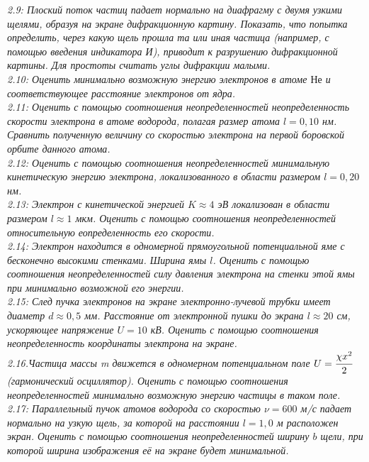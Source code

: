     \emph{2.9: Плоский поток частиц падает нормально на диафрагму 
       	с двумя узкими щелями, образуя на экране дифракционную 
       	картину. Показать, что попытка определить, через какую 
       	щель прошла та или иная частица (например, с помощью 
       	введения индикатора И), приводит к разрушению дифракционной 
       	картины. Для простоты считать углы дифракции малыми.}\\

    \emph{2.10: Оценить минимально возможную энергию электронов 
       	в атоме \( Не \) и соответствующее расстояние электронов 
       	от ядра.}\\

    \emph{2.11: Оценить с помощью соотношения неопределенностей 
       	неопределенность скорости электрона в атоме водорода, 
       	полагая размер атома \( l = 0,10 \) нм. Сравнить полученную 
       	величину со скоростью электрона на первой боровской 
       	орбите данного атома.}\\

    \emph{2.12: Оценить с помощью соотношения неопределенностей 
       	минимальную кинетическую энергию электрона, локализованного 
       	в области размером \( l = 0,20 \) нм.}\\

    \emph{2.13: Электрон с кинетической энергией \( K \approx 4 \) эВ 
       	локализован в области размером \( l \approx 1 \) мкм. 
        Оценить с помощью соотношения неопределенностей 
        относительную еопределенность его скорости.}\\

    \emph{2.14: Электрон находится в одномерной прямоугольной 
      	потенциальной яме с бесконечно высокими стенками. 
       	Ширина ямы \( l \). Оценить с помощью соотношения 
       	неопределенностей силу давления электрона на стенки этой
		ямы при минимально возможной его энергии.}\\

	\emph{2.15: След пучка электронов на экране электронно-лучевой 
		трубки имеет диаметр \( d \approx 0,5 \) мм. Расстояние от 
		электронной пушки до экрана \( l \approx 20 \) см, 
		ускоряющее напряжение \( U = 10 \) кВ. Оценить с помощью 
		соотношения неопределенность координаты электрона на экране.}\\

	\emph{2.16.Частица массы m движется в одномерном потенциальном 
		поле \( U = \cfrac{\chi x^2}{2} \) (гармонический осциллятор). 
		Оценить с помощью соотношения неопределенностей минимально 
		возможную энергию частицы в таком поле.}\\

	\emph{2.17: Параллельный пучок атомов водорода со скоростью 
		\( \nu = 600 \) м/с падает нормально на узкую щель, за которой 
		на расстоянии \( l = 1,0 \) м расположен экран. Оценить с помощью 
		соотношения неопределенностей ширину \( b \) щели, при которой 
		ширина изображения её на экране будет минимальной.}\\
